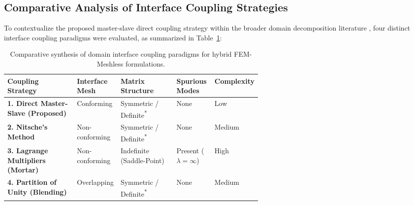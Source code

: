 \documentclass[preprint,12pt]{elsarticle}
\begin{document}
\subsection{Comparative Analysis of Interface Coupling Strategies}
\label{subsec:coupling_comparison}

To contextualize the proposed master-slave direct coupling strategy within the broader domain decomposition literature \cite{quarteroni1999domain, smith1996domain, toselli2005domain, tsukerman1992overlapping, elkadmiri2022hybrid}, four distinct interface coupling paradigms were evaluated, as summarized in Table~\ref{tab:hybrid_coupling_comparison}:

\begin{table}[!htbp]
\centering
\small
\setlength{\tabcolsep}{6pt}
\caption{Comparative synthesis of domain interface coupling paradigms for hybrid FEM-Meshless formulations.}
\label{tab:hybrid_coupling_comparison}
\begin{tabularx}{\linewidth}{@{}
>{\raggedright\arraybackslash}X
>{\centering\arraybackslash}p{0.13\linewidth}
>{\centering\arraybackslash}p{0.22\linewidth}
>{\centering\arraybackslash}p{0.15\linewidth}
>{\centering\arraybackslash}p{0.10\linewidth}
@{}}
\toprule
\textbf{Coupling Strategy} & 
\textbf{Interface Mesh} & 
\textbf{Matrix Structure} & 
\textbf{Spurious Modes} & 
\textbf{Complexity} \\
\midrule
\textbf{1. Direct Master-Slave (Proposed)} & Conforming & Symmetric / Definite\textsuperscript{*} & None & Low \\
\textbf{2. Nitsche's Method \cite{nitsche1971uber, fernandez2004imposing}} & Non-conforming & Symmetric / Definite\textsuperscript{*} & None & Medium \\
\textbf{3. Lagrange Multipliers (Mortar) \cite{brezzi1974existence, bernardi1994mortar, buffa2001mortar}} & Non-conforming & Indefinite (Saddle-Point) & Present ($\lambda=\infty$) & High \\
\textbf{4. Partition of Unity (Blending) \cite{melenk1996partition, krongauz1996enforcement}} & Overlapping & Symmetric / Definite\textsuperscript{*} & None & Medium \\
\bottomrule
\end{tabularx}
\vspace{2pt}
\end{table}
\end{document}
